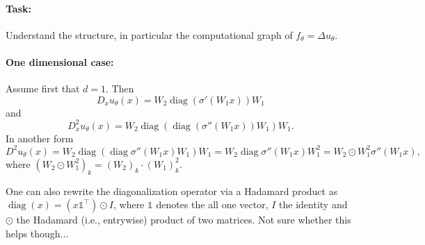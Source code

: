 \documentclass[11pt]{article}
\theoremstyle{definition}
\theoremstyle{plain}
\begin{document}
\paragraph{Task: }
Understand the structure, in particular the computational graph of $f_\theta = \Delta u_\theta$.

\paragraph{One dimensional case: }
Assume first that $d=1$.
Then
\[ D_x u_\theta(x) = W_2 \operatorname{diag}(\sigma'(W_1 x)) W_1 \]
and
\[ D^2_x u_\theta(x) = W_2%
  \operatorname{diag}(\operatorname{diag}(\sigma''(W_1 x)) W_1)W_1. %
\]
In another form
\[D^2 u_\theta(x) = W_2 \operatorname{diag}(\operatorname{diag}\sigma''(W_1 x) W_1) W_1 = W_2 \operatorname{diag}\sigma''(W_1 x) W_1^2 = W_2\odot W_1^2 \sigma''(W_1x),
\]
where $(W_2\odot W_1^2)_k = (W_2)_k \cdot (W_1)_k^2$.

One can also rewrite the diagonalization operator via a Hadamard product as $\operatorname{diag}(x) = (x\mathds{1}^\top)\odot I$, where $\mathds{1}$ denotes the all one vector, $I$ the identity and $\odot$ the Hadamard (i.e., entrywise) product of two matrices.
Not sure whether this helps though...

\end{document}
